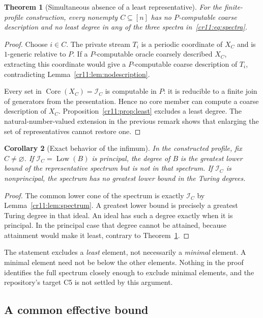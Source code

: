 \documentclass[11pt,letterpaper]{article}
\theoremstyle{plain}
\newtheorem{theorem}{Theorem}[section]
\newtheorem{corollary}[theorem]{Corollary}
\theoremstyle{definition}
\theoremstyle{remark}
\numberwithin{equation}{section}
\newcommand{\Core}{\operatorname{Core}}
\newcommand{\Low}{\operatorname{Low}}
\newcommand{\I}{\mathcal I}
\begin{document}
\begin{theorem}[Simultaneous absence of a least representative]\label{cr11:thm:noleast}
For the finite-profile construction, every nonempty $C\subseteq[n]$ has no
$P$-computable coarse description and no least degree in any of the three
spectra in~\eqref{cr11:eq:spectra}.
\end{theorem}
\begin{proof}
Choose $i\in C$. The private stream $T_i$ is a periodic coordinate of
$X_C$ and is $1$-generic relative to $P$. If a $P$-computable oracle
coarsely described $X_C$, extracting this coordinate would give a
$P$-computable coarse description of $T_i$, contradicting
Lemma~\ref{cr11:lem:nodescription}.

Every set in $\Core(X_C)=\I_C$ is computable in $P$: it is reducible to a
finite join of generators from the presentation. Hence no core member can
compute a coarse description of $X_C$. Proposition~\ref{cr11:prop:least}
excludes a least degree. The natural-number-valued extension in the previous
remark shows that enlarging the set of representatives cannot restore one.
\end{proof}

\begin{corollary}[Exact behavior of the infimum]\label{cr11:cor:infima}
In the constructed profile, fix $C\ne\varnothing$.
If $\I_C=\Low(B)$ is principal, the degree of $B$ is the greatest lower
bound of the representative spectrum but is not in that spectrum.
If $\I_C$ is nonprincipal, the spectrum has no greatest lower bound in the
Turing degrees.
\end{corollary}
\begin{proof}
The common lower cone of the spectrum is exactly $\I_C$ by
Lemma~\ref{cr11:lem:spectrum}. A greatest lower bound is precisely a greatest
Turing degree in that ideal. An ideal has such a degree exactly when it is
principal. In the principal case that degree cannot be attained, because
attainment would make it least, contrary to Theorem~\ref{cr11:thm:noleast}.
\end{proof}

The statement excludes a \emph{least} element, not necessarily a
\emph{minimal} element. A minimal element need not be below the other
elements. Nothing in the proof identifies the full spectrum closely enough
to exclude minimal elements, and the repository's target C5 is not settled
by this argument.

\subsection{A common effective bound}
\end{document}
